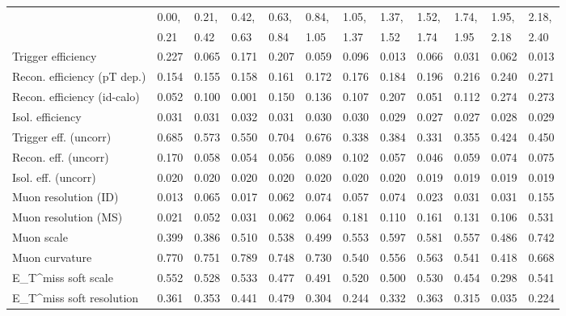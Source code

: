 \begin{tabular}{l|p{0.6cm}p{0.6cm}p{0.6cm}p{0.6cm}p{0.6cm}p{0.6cm}p{0.6cm}p{0.6cm}p{0.6cm}p{0.6cm}p{0.6cm}}
\hline
   & 0.00, & 0.21, & 0.42, & 0.63, & 0.84, & 1.05, & 1.37, & 1.52, & 1.74, & 1.95, & 2.18,  \\ 
   & 0.21 & 0.42 & 0.63 & 0.84 & 1.05 & 1.37 & 1.52 & 1.74 & 1.95 & 2.18 & 2.40  \\ 
\hline
Trigger efficiency                       & 0.227 & 0.065 & 0.171 & 0.207 & 0.059 & 0.096 & 0.013 & 0.066 & 0.031 & 0.062 & 0.013 \\
Recon. efficiency (pT dep.)              & 0.154 & 0.155 & 0.158 & 0.161 & 0.172 & 0.176 & 0.184 & 0.196 & 0.216 & 0.240 & 0.271 \\
Recon. efficiency (id-calo)              & 0.052 & 0.100 & 0.001 & 0.150 & 0.136 & 0.107 & 0.207 & 0.051 & 0.112 & 0.274 & 0.273 \\
Isol. efficiency                         & 0.031 & 0.031 & 0.032 & 0.031 & 0.030 & 0.030 & 0.029 & 0.027 & 0.027 & 0.028 & 0.029 \\
Trigger eff. (uncorr)                    & 0.685 & 0.573 & 0.550 & 0.704 & 0.676 & 0.338 & 0.384 & 0.331 & 0.355 & 0.424 & 0.450 \\
Recon. eff. (uncorr)                     & 0.170 & 0.058 & 0.054 & 0.056 & 0.089 & 0.102 & 0.057 & 0.046 & 0.059 & 0.074 & 0.075 \\
Isol. eff. (uncorr)                      & 0.020 & 0.020 & 0.020 & 0.020 & 0.020 & 0.020 & 0.020 & 0.019 & 0.019 & 0.019 & 0.019 \\
Muon resolution (ID)                     & 0.013 & 0.065 & 0.017 & 0.062 & 0.074 & 0.057 & 0.074 & 0.023 & 0.031 & 0.031 & 0.155 \\
Muon resolution (MS)                     & 0.021 & 0.052 & 0.031 & 0.062 & 0.064 & 0.181 & 0.110 & 0.161 & 0.131 & 0.106 & 0.531 \\
Muon scale                               & 0.399 & 0.386 & 0.510 & 0.538 & 0.499 & 0.553 & 0.597 & 0.581 & 0.557 & 0.486 & 0.742 \\
Muon curvature                           & 0.770 & 0.751 & 0.789 & 0.748 & 0.730 & 0.540 & 0.556 & 0.563 & 0.541 & 0.418 & 0.668 \\
E_{T}^{miss} soft scale                  & 0.552 & 0.528 & 0.533 & 0.477 & 0.491 & 0.520 & 0.500 & 0.530 & 0.454 & 0.298 & 0.541 \\
E_{T}^{miss} soft resolution             & 0.361 & 0.353 & 0.441 & 0.479 & 0.304 & 0.244 & 0.332 & 0.363 & 0.315 & 0.035 & 0.224 \\

\end{tabular}
